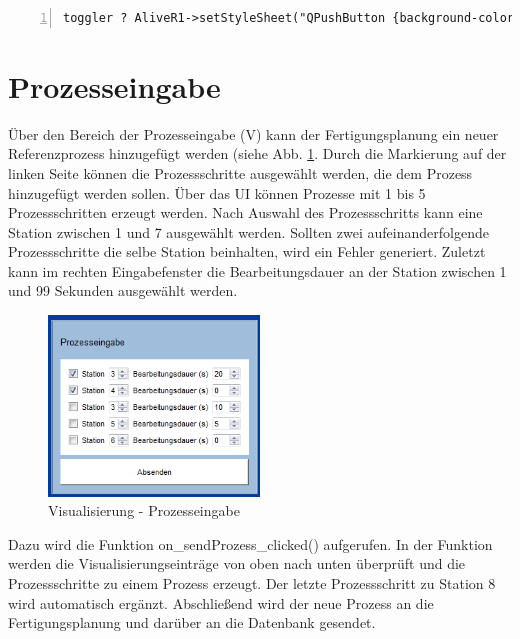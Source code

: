 \begin{lstlisting}[frame=single, breaklines=true, numbers=left, stepnumber=2, firstnumber=1, numberstyle = \tiny, caption=Stylesheet Aktualisierung der Alive-LED ,label=lst:LEDtoggle]
toggler ? AliveR1->setStyleSheet("QPushButton {background-color: rgb(0,250,50); border-radius: 6px;}") : AliveR1->setStyleSheet("QPushButton {background-color: green; border-radius: 6px;}");
\end{lstlisting}

\section{Prozesseingabe}
\label{sec:Prozesseingabe}

Über den Bereich der Prozesseingabe (V) kann der Fertigungsplanung ein neuer Referenzprozess hinzugefügt werden (siehe Abb. \ref{fig:Prozesseingabe}. Durch die Markierung auf der linken Seite können die Prozessschritte ausgewählt werden, die dem Prozess hinzugefügt werden sollen. Über das UI können Prozesse mit 1 bis 5 Prozessschritten erzeugt werden. Nach Auswahl des Prozessschritts kann eine Station zwischen 1 und 7 ausgewählt werden. Sollten zwei aufeinanderfolgende Prozessschritte die selbe Station beinhalten, wird ein Fehler generiert. Zuletzt kann im rechten Eingabefenster die Bearbeitungsdauer an der Station zwischen 1 und 99 Sekunden ausgewählt werden.

\begin{figure}[htb]
    \centering
    \includegraphics[width=0.5\textwidth]{Abbildungen/Prozesseingabe.png}
    \caption{Visualisierung - Prozesseingabe}		
    \label{fig:Prozesseingabe}
\end{figure}

Dazu wird die Funktion on\_sendProzess\_clicked() aufgerufen. In der Funktion werden die Visualisierungseinträge von oben nach unten überprüft und die Prozessschritte zu einem Prozess erzeugt. Der letzte Prozessschritt zu Station 8 wird automatisch ergänzt. Abschließend wird der neue Prozess an die Fertigungsplanung und darüber an die Datenbank gesendet. 


